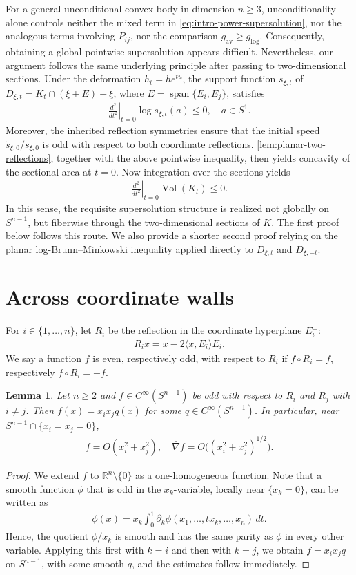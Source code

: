 \documentclass[12pt]{amsart}
\newcommand{\R}{\mathbb{R}}
\newcommand{\Sn}{S^{n-1}}
\newcommand{\ip}[2]{\langle #1,#2\rangle}
\newcommand{\eq}[1]{\begin{equation}\begin{alignedat}{2}#1\end{alignedat}\end{equation}}
\theoremstyle{plain}
\newtheorem{lemma}[theorem]{Lemma}
\theoremstyle{definition}
\theoremstyle{remark}
\numberwithin{equation}{section}
\begin{document}
For a general unconditional convex body in dimension $n\ge 3$, unconditionality alone controls neither the mixed term in \eqref{eq:intro-power-supersolution}, nor the analogous terms involving $P_{ij}$, nor the comparison $g_{\mathrm{av}}\geq g_{\log}$. Consequently, obtaining a global pointwise supersolution appears difficult. Nevertheless, our argument follows the same underlying principle after passing to two-dimensional sections. Under the deformation $h_t=he^{tu}$, the support function $s_{\xi,t}$ of $D_{\xi,t}=K_t\cap(\xi+E)-\xi$, where $E=\operatorname{span}\{E_i,E_j\}$, satisfies
\eq{
\left.\frac{d^2}{dt^2}\right|_{t=0}
\log s_{\xi,t}(a)\leq 0,
\quad a\in S^1.
}
Moreover, the inherited reflection symmetries ensure that the initial speed $\dot{s}_{\xi,0}/s_{\xi,0}$ is odd with respect to both coordinate reflections. \autoref{lem:planar-two-reflections}, together with the above pointwise inequality, then yields concavity of the sectional area at $t=0$. Now integration over the sections yields
\eq{
\left.\frac{d^2}{dt^2}\right|_{t=0}
\operatorname{Vol}(K_t)\leq 0.
}
In this sense, the requisite supersolution structure is realized not globally on $\Sn$, but fiberwise through the two-dimensional sections of $K$. The first proof below follows this route. We also provide a shorter second proof relying on the planar log-Brunn--Minkowski inequality applied directly to $D_{\xi,t}$ and $D_{\xi,-t}$. 


\section{Across coordinate walls}

For $i\in\{1,\ldots,n\}$, let $R_i$ be the reflection in the coordinate hyperplane $E_i^{\perp}$:
\eq{
 R_i x=x-2\ip{x}{E_i}E_i.
}
We say a function $f$ is even, respectively odd, with respect to $R_i$ if
$f\circ R_i=f$, respectively $f\circ R_i=-f$.

\begin{lemma}\label{lem:double-odd-division}
Let $n\geq2$ and $f\in C^{\infty}(S^{n-1})$ be odd with respect to $R_i$ and $R_j$ with $i\ne j$. Then $f(x)=x_ix_jq(x)$ for some $q\in C^{\infty}(S^{n-1})$. In particular, near $S^{n-1}\cap\{x_i=x_j=0\}$,
\eq{
 f=O(x_i^2+x_j^2),\quad
 \bar{\nabla} f=O\big((x_i^2+x_j^2)^{1/2}\big).
}
\end{lemma}

\begin{proof}
We extend $f$ to $\R^n\setminus\{0\}$ as a one-homogeneous function. Note that a smooth function $\phi$ that is odd in the $x_k$-variable, locally near $\{x_k=0\}$, can be written as
\eq{
 \phi(x)=x_k\int_0^1
 \partial_k\phi(x_1,\ldots,tx_k,\ldots,x_n)\,dt.
}
Hence, the quotient $\phi/x_k$ is smooth and has the same parity as $\phi$ in every other variable. Applying this first with $k=i$ and then with $k=j$, we obtain $f=x_ix_jq$ on $S^{n-1}$, with some smooth $q$, and the estimates follow immediately.
\end{proof}
\end{document}
